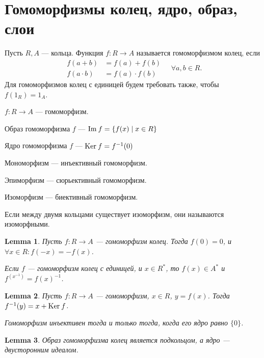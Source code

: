 \documentclass[11pt]{book}
\newcommand{\im}{{\mathop{\text{\rm Im}}}\:}
\renewcommand{\ker}{{\mathop{\text{\rm Ker}}}\:}
\theoremstyle{definition}
\theoremstyle{plain}
\theoremstyle{plain}
\newtheorem{lm}{Lemma}
\theoremstyle{definition}
\theoremstyle{remark}
\begin{document}
\section{Гомоморфизмы колец, ядро, образ, слои}
\begin{defn}
    Пусть $ R, A$ --- кольца. Функция  $ f : R \to  A$ называется {\sf гомоморфизмом колец}, если \[
	\begin{aligned}
	    f(a + b) & = f(a)+f(b) \\
	    f(a \cdot b) &= f(a) \cdot f(b)
	\end{aligned}
	\quad	\forall a, b \in R
    .\]
    Для гомоморфизмов колец с единицей будем требовать также, чтобы $ f(1_R) = 1_A$.
\end{defn}
\begin{defn}
    $ f: R \to  A$ --- гомоморфизм.
    \begin{description}[noitemsep]
	\item {\sf Образ гомоморфизма} $ f$ --- $\im f = \{f(x) \mid x \in R\} $
	\item {\sf Ядро гомоморфизма} $ f$ ---  $ \ker f = f^{-1}(0)$
	\item {\sf Мономорфизм} --- инъективный гомоморфизм.
	\item {\sf Эпиморфизм} --- сюрьективный гомоморфизм.
	\item {\sf Изоморфизм} --- биективный гомоморфизм.
    \end{description}
    Если между двумя кольцами существует изоморфизм, они называются {\sf изоморфными}.
\end{defn}
\begin{lm}
    Пусть $ f: R \to  A$ --- гомоморфизм колец. Тогда $ f(0) = 0$, и  $ \forall x \in R: f(-x) = -f(x)$.

    Если $ f$ --- гомоморфизм колец с единицей, и  $ x \in R^{*}$, то $ f(x) \in A^{*}$ и $ f^{(x^{-1})} = f(x)^{-1}$.
\end{lm}
\begin{lm}
    Пусть $ f: R \to  A$ --- гомоморфизм, $ x \in  R$, $ y = f(x)$. Тогда $ f^{-1}(y) = x + \ker f$.

    Гомоморфизм инъективен тогда и только тогда, когда его ядро равно $ \{0\}$.
\end{lm}
\begin{lm}
    Образ гомоморфизма колец является подкольцом, а ядро --- двусторонним идеалом.
\end{lm}
\end{document}
